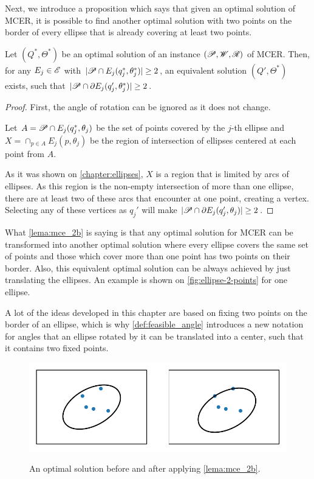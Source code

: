 Next, we introduce a proposition which says that given an optimal solution of MCER, it is possible to find another optimal solution with two points on the border of every ellipse that is already covering at least two points.

\begin{proposicao}\label{lema:mce_2b}
	Let $(Q^*, \Theta^*)$ be an optimal solution of an instance $(\mathscr{P}, \mathscr{W}, \mathscr{R})$ of MCER. 
	Then, for any $E_j \in \mathscr{E}$ with $|\mathscr{P} \cap E_j(q_j^*, \theta_j^*)|\ge2$, 
	an equivalent solution $(Q', \Theta^*)$ exists, such that $|\mathscr{P} \cap \partial E_j(q_j', \theta_j^*)|\ge 2$.
\end{proposicao}

\begin{proof}
	First, the angle of rotation can be ignored as it does not change.
	
	Let $A=\mathscr{P} \cap E_j(q_j^*, \theta_j)$ be the set of points covered by the $j$-th ellipse and $X=\cap_{p \in A}E_j(p, \theta_j)$ be the region of intersection of ellipses centered at each point from $A$.

	As it was shown on \autoref{chapter:ellipses}, $X$ is a region that is limited by arcs of ellipses. As this region is the non-empty intersection of more than one ellipse, there are at least two of these arcs that encounter at one point, creating a vertex. Selecting any of these vertices as $q_j'$ will make $|\mathscr{P} \cap \partial E_j(q_j', \theta_j)| \ge 2$.
	
\end{proof}

What \autoref{lema:mce_2b} is saying is that any optimal solution for MCER can be transformed into another optimal solution where every ellipse covers the same set of points and those which cover more than one point has two points on their border. Also, this equivalent optimal solution can be always achieved by just translating the ellipses. An example is shown on \autoref{fig:ellipse-2-points} for one ellipse.

A lot of the ideas developed in this chapter are based on fixing two points on the border of an ellipse, which is why \autoref{def:feasible_angle} introduces a new notation for angles that an ellipse rotated by it can be translated into a center, such that it contains two fixed points. 

\begin{figure}
	\centering
	\caption{An optimal solution before and after applying \autoref{lema:mce_2b}.}
	\includegraphics{tex/figures/scripts/ellipse-2-points}
	\fautor
	\label{fig:ellipse-2-points}
\end{figure}

